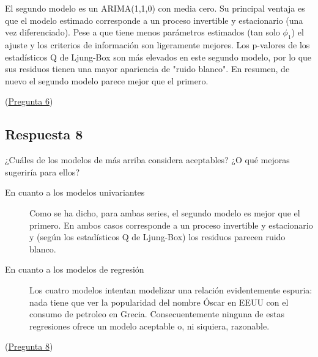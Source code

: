 \documentclass[10pt]{article}
\begin{document}
El segundo modelo es un ARIMA(1,1,0) con media cero. Su principal
ventaja es que el modelo estimado corresponde a un proceso invertible
y estacionario (una vez diferenciado). Pese a que tiene menos
parámetros estimados (tan solo \(\phi_1\)) el ajuste y los criterios de
información son ligeramente mejores. Los p-valores de los estadísticos
Q de Ljung-Box son más elevados en este segundo modelo, por lo que sus
residuos tienen una mayor apariencia de "ruido blanco". En resumen, de
nuevo el segundo modelo parece mejor que el primero.

(\hyperref[sec:orge17419d]{Pregunta 6})
\subsection*{Respuesta 8}
\label{sec:orge87796c}

¿Cuáles de los modelos de más arriba considera aceptables? ¿O qué
mejoras sugeriría para ellos?

\begin{description}
\item[{En cuanto a los modelos univariantes}] Como se ha dicho, para ambas
series, el segundo modelo es mejor que el primero. En ambos casos
corresponde a un proceso invertible y estacionario y (según los
estadísticos Q de Ljung-Box) los residuos parecen ruido blanco.

\item[{En cuanto a los modelos de regresión}] Los cuatro modelos intentan
modelizar una relación evidentemente espuria: nada tiene que ver la
popularidad del nombre Óscar en EEUU con el consumo de petroleo en
Grecia. Consecuentemente ninguna de estas regresiones ofrece un
modelo aceptable o, ni siquiera, razonable.
\end{description}

(\hyperref[sec:org787217f]{Pregunta 8})
\end{document}
